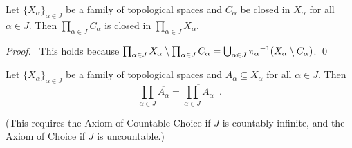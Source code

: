 \begin{prop}
  \label{prop:product:closed}
  Let $\{ X_\alpha \}_{\alpha \in J}$ be a family of topological spaces and $C_\alpha$ be closed in $X_\alpha$ for all $\alpha \in J$. Then $\prod_{\alpha \in J} C_\alpha$ is closed in $\prod_{\alpha \in J} X_\alpha$.
\end{prop}

\begin{proof}
  \pf\ This holds because $\prod_{\alpha \in J} X_\alpha \setminus \prod_{\alpha \in J} C_\alpha = \bigcup_{\alpha \in J} {\pi_\alpha}^{-1} (X_\alpha \setminus C_\alpha)$. \qed
\end{proof}

\begin{prop}[AC]
  \label{prop:product:closure}
  Let $\{ X_\alpha \}_{\alpha \in J}$ be a family of topological spaces and $A_\alpha \subseteq X_\alpha$ for all $\alpha \in J$. Then
  \[ \prod_{\alpha \in J} \overline{A_\alpha} = \overline{\prod_{\alpha \in J} A_\alpha} \enspace . \]

  (This requires the Axiom of Countable Choice if $J$ is countably infinite, and the Axiom of Choice if $J$ is uncountable.)
\end{prop}

